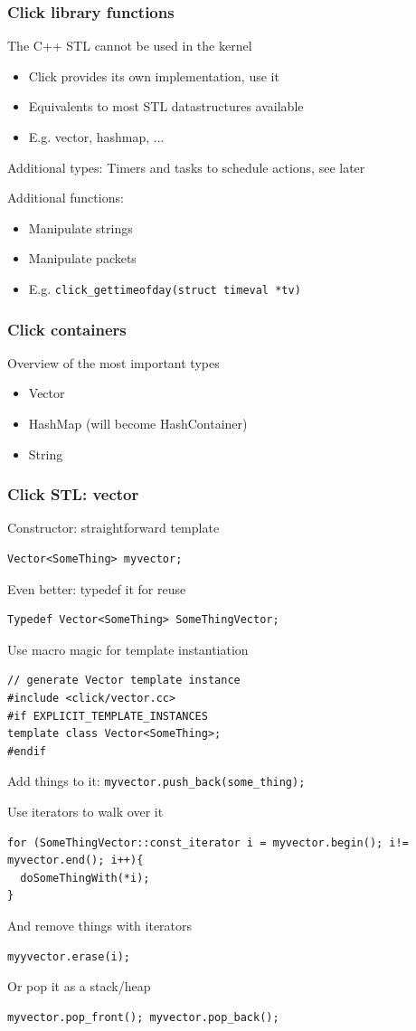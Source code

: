 \documentclass{beamer}
\begin{document}
\begin{frame}
\frametitle{Click library functions}
The C++ STL cannot be used in the kernel
\begin{itemize}
	\item Click provides its own implementation, use it
	\item Equivalents to most STL datastructures available
	\item E.g. vector, hashmap, ...
\end{itemize}
Additional types: Timers and tasks to schedule actions, see later

Additional functions:
\begin{itemize}
	\item Manipulate strings
	\item Manipulate packets
	\item E.g. \lstinline!click_gettimeofday(struct timeval *tv)!
\end{itemize}
\end{frame}

\begin{frame}
\frametitle{Click containers}
Overview of the most important types
\begin{itemize}
	\item Vector
	\item HashMap (will become HashContainer)
	\item String
\end{itemize}
\end{frame}

\begin{frame}
\frametitle{Click STL: vector}
Constructor: straightforward template
\begin{lstlisting}
Vector<SomeThing> myvector;
\end{lstlisting}
Even better: typedef it for reuse
\begin{lstlisting}
Typedef Vector<SomeThing> SomeThingVector; 
\end{lstlisting}
Use macro magic for template instantiation
\begin{lstlisting}[basicstyle=\footnotesize]
// generate Vector template instance
#include <click/vector.cc>
#if EXPLICIT_TEMPLATE_INSTANCES
template class Vector<SomeThing>;
#endif
\end{lstlisting}
Add things to it: \lstinline!myvector.push_back(some_thing);!

Use iterators to walk over it
\begin{lstlisting}[basicstyle=\footnotesize]
for (SomeThingVector::const_iterator i = myvector.begin(); i!= myvector.end(); i++){
  doSomeThingWith(*i);  
}
\end{lstlisting}
And remove things with iterators
\begin{lstlisting}
myyvector.erase(i);
\end{lstlisting}
Or pop it as a stack/heap
\begin{lstlisting}
myvector.pop_front(); myvector.pop_back();
\end{lstlisting}
\end{frame}
\end{document}

